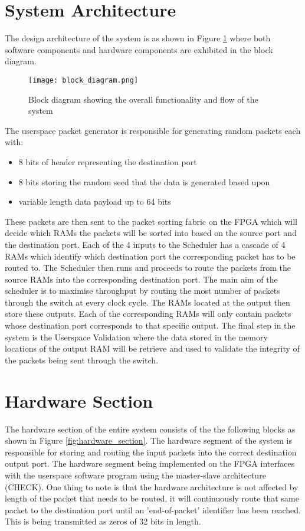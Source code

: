 \documentclass[twoside,12pt,fleqn]{book} %
\begin{document}
\section{System Architecture}
The design architecture of the system is as shown in Figure \ref{fig:block_diagram} where both software components and hardware components are exhibited in the block diagram.
    \begin{figure}[ht]
        \centering
        \texttt{[image: block\_diagram.png]}
        \caption{Block diagram showing the overall functionality and flow of the system}
        \label{fig:block_diagram}
    \end{figure}
\newpage
The userspace packet generator is responsible for generating random packets each with:
\begin{itemize}
    \item 8 bits of header representing the destination port
    \item 8 bits storing the random seed that the data is generated based upon
    \item variable length data payload up to 64 bits
\end{itemize}
These packets are then sent to the packet sorting fabric on the FPGA which will decide which RAMs the packets will be sorted into based on the source port and the destination port. Each of the 4 inputs to the Scheduler has a cascade of 4 RAMs which identify which destination port the corresponding packet has to be routed to. The Scheduler then runs and proceeds to route the packets from the source RAMs into the corresponding destination port. The main aim of the scheduler is to maximise throughput by routing the most number of packets through the switch at every clock cycle. The RAMs located at the output then store these outputs. Each of the corresponding RAMs will only contain packets whose destination port corresponds to that specific output. The final step in the system is the Userspace Validation where the data stored in the memory locations of the output RAM will be retrieve and used to validate the integrity of the packets being sent through the switch.

\section{Hardware Section}
The hardware section of the entire system consists of the the following blocks as shown in Figure \ref{fig:hardware_section}. The hardware segment of the system is responsible for storing and routing the input packets into the correct destination output port. The hardware segment being implemented on the FPGA interfaces with the userspace software program using the master-slave architecture (CHECK). One thing to note is that the hardware architecture is not affected by length of the packet that needs to be routed, it will continuously route that same packet to the destination port until an 'end-of-packet' identifier has been reached. This is being transmitted as zeros of 32 bits in length.
    
\end{document}
